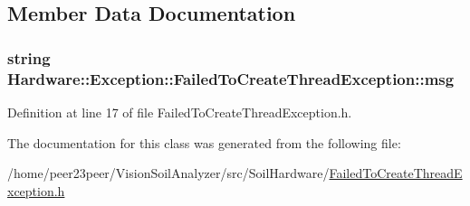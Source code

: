 \subsection{Member Data Documentation}
\hypertarget{class_hardware_1_1_exception_1_1_failed_to_create_thread_exception_a095cd7250c0a527623cf993c991572a8}{}
\subsubsection[{msg}]{\setlength{\rightskip}{0pt plus 5cm}string Hardware\+::\+Exception\+::\+Failed\+To\+Create\+Thread\+Exception\+::msg\hspace{0.3cm}{\ttfamily [private]}}\label{class_hardware_1_1_exception_1_1_failed_to_create_thread_exception_a095cd7250c0a527623cf993c991572a8}


Definition at line 17 of file Failed\+To\+Create\+Thread\+Exception.\+h.



The documentation for this class was generated from the following file\+:\begin{DoxyCompactItemize}
\item 
/home/peer23peer/\+Vision\+Soil\+Analyzer/src/\+Soil\+Hardware/\hyperlink{_failed_to_create_thread_exception_8h}{Failed\+To\+Create\+Thread\+Exception.\+h}\end{DoxyCompactItemize}
